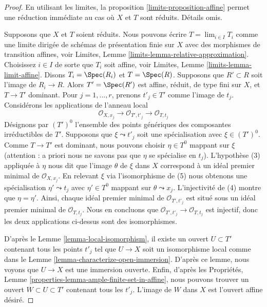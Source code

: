 \begin{proof}
En utilisant les limites, la proposition
\ref{limits-proposition-affine} permet une réduction
immédiate au cas où $X$ et $T$ sont réduits. Détails omis.

\medskip\noindent
Supposons que $X$ et $T$ soient réduits. Nous pouvons écrire
$T = \lim_{i \in I} T_i$ comme une limite dirigée de schémas
de présentation finie sur $X$ avec des morphismes de
transition affines, voir Limites, Lemme
\ref{limits-lemma-relative-approximation}. Choisissez $i \in I$
de sorte que $T_i$ soit affine, voir Limites, Lemme
\ref{limits-lemma-limit-affine}. Disons $T_i = \Spec(R_i)$ et $T =
\Spec(R)$. Supposons que $R' \subset R$ soit l'image de $R_i \to R$.
Alors $T' = \Spec(R')$ est affine, réduit, de type fini sur $X$, et
$T \to T'$ dominant. Pour $j = 1, \ldots, r$, prenons $t'_j \in T'$
comme l'image de $t_j$. Considérons les applications de l'anneau local
$$
\mathcal{O}_{X, x_j} \to
\mathcal{O}_{T', t'_j} \to
\mathcal{O}_{T, t_j}
$$
Désignons par $(T')^0$ l'ensemble des points génériques des composantes
irréductibles de $T'$. Supposons que $\xi \leadsto t'_j$ soit une
spécialisation avec $\xi \in (T')^0$. Comme $T \to T'$ est dominant, nous
pouvons choisir $\eta \in T^0$ mappant sur $\xi$ (attention : a priori nous
ne savons pas que $\eta$ se spécialise en $t_j$). L'hypothèse (3) appliquée
à $\eta$ nous dit que l'image $\theta$ de $\xi$ dans $X$ correspond à un
idéal premier minimal de $\mathcal{O}_{X, x_j}$. En relevant $\xi$ via
l'isomorphisme de (5) nous obtenons une spécialisation $\eta' \leadsto t_j$
avec $\eta' \in T^0$ mappant sur $\theta \leadsto x_j$. L'injectivité de (4)
montre que $\eta = \eta'$. Ainsi, chaque idéal premier minimal de
$\mathcal{O}_{T', t'_j}$ est situé sous un idéal premier minimal de
$\mathcal{O}_{T, t_j}$. Nous en concluons que $\mathcal{O}_{T', t'_j} \to
\mathcal{O}_{T, t_j}$ est injectif, donc les deux applications ci-dessus sont des isomorphismes.

\medskip\noindent
D'après le Lemme \ref{lemma-local-isomorphism}, il
existe un ouvert $U \subset T'$ contenant tous les
points $t'_j$ tel que $U \to X$ soit un
isomorphisme local comme dans le Lemme
\ref{lemma-characterize-open-immersion}. D'après ce
lemme, nous voyons que $U \to X$ est une immersion
ouverte. Enfin, d'après les Propriétés, Lemme
\ref{properties-lemma-ample-finite-set-in-affine}, nous
pouvons trouver un ouvert $W \subset U \subset T'$ contenant tous
les $t'_j$. L'image de $W$ dans $X$ est l'ouvert affine désiré.
\end{proof}

